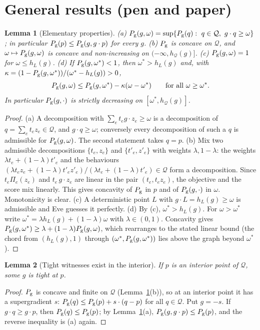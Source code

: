 \documentclass[11pt]{article}
\newtheorem{lemma}{Lemma}
\theoremstyle{definition}\newtheorem{definition}{Definition}
\theoremstyle{remark}\newtheorem{remark}{Remark}
\newcommand{\Q}{\mathcal Q}
\newcommand{\Pg}{P_{\rm g}}
\begin{document}
\section{General results (pen and paper)}
\begin{lemma}[Elementary properties]\label{lem:props}
(a) $\Pg(g,\omega)=\sup\{\Pg(q):\ q\in\Q,\ g\cdot q\ge\omega\}$; in particular $\Pg(p)\le\Pg(g,g\cdot p)$ for every $g$.
(b) $\Pg$ is concave on $\Q$, and $\omega\mapsto\Pg(g,\omega)$ is concave and non-increasing on $(-\infty,h_\Q(g)]$.
(c) $\Pg(g,\omega)=1$ for $\omega\le h_L(g)$.
(d) If $\Pg(g,\omega^*)<1$, then $\omega^*>h_L(g)$ and, with $\kappa=(1-\Pg(g,\omega^*))/(\omega^*-h_L(g))>0$,
\[
\Pg(g,\omega)\le\Pg(g,\omega^*)-\kappa(\omega-\omega^*)\qquad\text{for all }\omega\ge\omega^*.
\]
In particular $\Pg(g,\cdot)$ is strictly decreasing on $[\omega^*,h_\Q(g)]$.
\end{lemma}
\begin{proof}
(a) A decomposition with $\sum_et_eg\cdot z_e\ge\omega$ is a decomposition of $q=\sum_et_ez_e\in\Q$, and $g\cdot q\ge\omega$; conversely every decomposition of such a $q$ is admissible for $\Pg(g,\omega)$. The second statement takes $q=p$.
(b) Mix two admissible decompositions $\{t_e,z_e\}$ and $\{t'_e,z'_e\}$ with weights $\lambda,1-\lambda$: the weights $\lambda t_e+(1-\lambda)t'_e$ and the behaviours $(\lambda t_ez_e+(1-\lambda)t'_ez'_e)/(\lambda t_e+(1-\lambda)t'_e)\in\Q$ form a decomposition. Since $t_e\Pi_e(z_e)$ and $t_e\,g\cdot z_e$ are linear in the pair $(t_e,t_ez_e)$, the objective and the score mix linearly. This gives concavity of $\Pg$ in $p$ and of $\Pg(g,\cdot)$ in $\omega$. Monotonicity is clear.
(c) A deterministic point $L$ with $g\cdot L=h_L(g)\ge\omega$ is admissible and Eve guesses it perfectly.
(d) By (c), $\omega^*>h_L(g)$. For $\omega>\omega^*$ write $\omega^*=\lambda h_L(g)+(1-\lambda)\omega$ with $\lambda\in(0,1)$. Concavity gives $\Pg(g,\omega^*)\ge\lambda+(1-\lambda)\Pg(g,\omega)$, which rearranges to the stated linear bound (the chord from $(h_L(g),1)$ through $(\omega^*,\Pg(g,\omega^*))$ lies above the graph beyond $\omega^*$).
\end{proof}

\begin{lemma}[Tight witnesses exist in the interior]\label{lem:exist}
If $p$ is an interior point of $\Q$, some $g$ is tight at $p$.
\end{lemma}
\begin{proof}
$\Pg$ is concave and finite on $\Q$ (Lemma~\ref{lem:props}(b)), so at an interior point it has a supergradient $s$: $\Pg(q)\le\Pg(p)+s\cdot(q-p)$ for all $q\in\Q$. Put $g=-s$. If $g\cdot q\ge g\cdot p$, then $\Pg(q)\le\Pg(p)$; by Lemma~\ref{lem:props}(a), $\Pg(g,g\cdot p)\le\Pg(p)$, and the reverse inequality is (a) again.
\end{proof}
\end{document}
